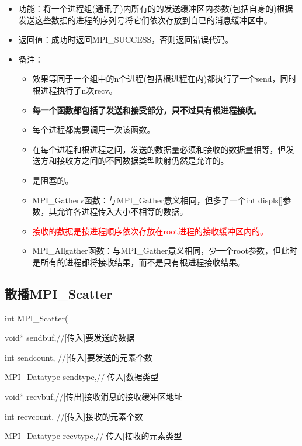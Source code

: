 \documentclass[UTF8]{article}%
\begin{document}
\begin{itemize}
    \item 功能：将一个进程组(通讯子)内所有的的发送缓冲区内参数(包括自身的)根据发送这些数据的进程的序列号将它们依次存放到自已的消息缓冲区中。
    \item 返回值：成功时返回MPI\_SUCCESS，否则返回错误代码。
    \item 备注：
    
    {
        \begin{itemize}
            \item 效果等同于一个组中的n个进程(包括根进程在内)都执行了一个send，同时根进程执行了n次recv。
            \item \textbf{每一个函数都包括了发送和接受部分，只不过只有根进程接收。}
            \item 每个进程都需要调用一次该函数。
            \item 在每个进程和根进程之间，发送的数据量必须和接收的数据量相等，但发送方和接收方之间的不同数据类型映射仍然是允许的。
            \item 是阻塞的。
            \item MPI\_Gatherv函数：与MPI\_Gather意义相同，但多了一个int \quad *displs[]参数，其允许各进程传入大小不相等的数据。
            \item \textcolor{red}{接收的数据是按进程顺序依次存放在root进程的接收缓冲区内的。}
            \item MPI\_Allgather函数：与MPI\_Gather意义相同，少一个root参数，但此时是所有的进程都将接收结果，而不是只有根进程接收结果。
        \end{itemize}
    }
\end{itemize}

\subsection{散播MPI\_Scatter}

int MPI\_Scatter(
    
    \qquad void* sendbuf,//[传入]要发送的数据

    \qquad int sendcount, //[传入]要发送的元素个数

    \qquad MPI\_Datatype sendtype,//[传入]数据类型

    \qquad void* recvbuf,//[传出]接收消息的接收缓冲区地址

    \qquad int recvcount, //[传入]接收的元素个数

    \qquad MPI\_Datatype recvtype,//[传入]接收的元素类型
                
\end{document}
